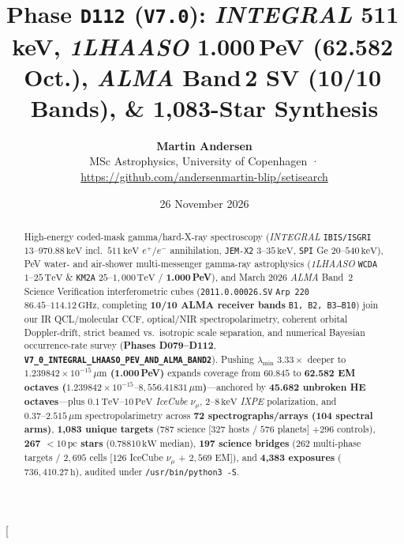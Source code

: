 \documentclass[twocolumn,10pt]{article}
\title{\vspace{-0.9em}\textbf{\Large Phase \texttt{D112} (\texttt{V7.0}): \textit{INTEGRAL} 511\,keV, \textit{1LHAASO} 1.000\,PeV (62.582\,Oct.), \textit{ALMA} Band\,2 SV (10/10\,Bands), \& 1,083-Star Synthesis}}
\author{\textbf{Martin Andersen}\\[0.2em]
\small MSc Astrophysics, University of Copenhagen · \href{https://github.com/andersenmartin-blip/setisearch}{https://github.com/andersenmartin-blip/setisearch}}
\date{\small 26 November 2026}
\begin{document}
\twocolumn[{
\begin{@twocolumnfalse}
\maketitle
\vspace{-1.1em}
\begin{abstract}
\noindent High-energy coded-mask gamma/hard-X-ray spectroscopy (\textit{INTEGRAL} \texttt{IBIS/ISGRI} $13\text{--}970.88\,\mathrm{keV}$ incl.\ $511\,\mathrm{keV}$ $e^+/e^-$ annihilation, \texttt{JEM-X2} $3\text{--}35\,\mathrm{keV}$, \texttt{SPI} Ge $20\text{--}540\,\mathrm{keV}$), PeV water- and air-shower multi-messenger gamma-ray astrophysics (\textit{1LHAASO} \texttt{WCDA} $1\text{--}25\,\mathrm{TeV}$ \& \texttt{KM2A} $25\text{--}1{,}000\,\mathrm{TeV}$ / \textbf{1.000\,PeV}), and March 2026 \textit{ALMA} Band~2 Science Verification interferometric cubes (\texttt{2011.0.00026.SV} \texttt{Arp\,220} $86.45\text{--}114.12\,\mathrm{GHz}$, completing \textbf{10/10 ALMA receiver bands} \texttt{B1, B2, B3--B10}) join our IR QCL/molecular CCF, optical/NIR spectropolarimetry, coherent orbital Doppler-drift, strict beamed vs.\ isotropic scale separation, and numerical Bayesian occurrence-rate survey (\textbf{Phases D079--D112}, \textbf{\texttt{V7\_0\_INTEGRAL\_LHAASO\_PEV\_AND\_ALMA\_BAND2}}). Pushing $\lambda_{\min}$ $3.33\times$ deeper to \textbf{$1.239842\times 10^{-15}\,\mu\text{m}$ (1.000\,PeV)} expands coverage from $60.845$ to \textbf{62.582 EM octaves ($1.239842\times 10^{-15}\text{--}8{,}556.41831\,\mu\text{m}$)}---anchored by \textbf{45.682 unbroken HE octaves}---plus $0.1\,\mathrm{TeV}\text{--}10\,\mathrm{PeV}$ \textit{IceCube} $\nu_\mu$, $2\text{--}8\,\mathrm{keV}$ \textit{IXPE} polarization, and $0.37\text{--}2.515\,\mu\text{m}$ spectropolarimetry across \textbf{72 spectrographs/arrays (104 spectral arms)}, \textbf{1,083 unique targets} ($787$ science [$327$ hosts / $576$ planets] $+ 296$ controls), \textbf{267 $<10\,\text{pc}$ stars} ($0.78810\,\mathrm{kW}$ median), \textbf{197 science bridges} ($262$ multi-phase targets / $2{,}695$ cells [$126$ IceCube $\nu_\mu$ + $2{,}569$ EM]), and \textbf{4,383 exposures} ($736{,}410.27\,\text{h}$), audited under \texttt{/usr/bin/python3 -S}.\par\smallskip

\end{abstract}
\end{@twocolumnfalse}}
\end{document}
